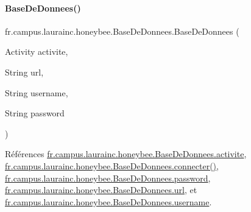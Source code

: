 \paragraph{\texorpdfstring{Base\+De\+Donnees()}{BaseDeDonnees()}\hspace{0.1cm}{\footnotesize\ttfamily [4/4]}}
{\footnotesize\ttfamily fr.\+campus.\+laurainc.\+honeybee.\+Base\+De\+Donnees.\+Base\+De\+Donnees (\begin{DoxyParamCaption}\item[{Activity}]{activite,  }\item[{String}]{url,  }\item[{String}]{username,  }\item[{String}]{password }\end{DoxyParamCaption})\hspace{0.3cm}{\ttfamily [private]}}



Références \hyperlink{classfr_1_1campus_1_1laurainc_1_1honeybee_1_1_base_de_donnees_aad4fd29f29916bc4277fa16262d19431}{fr.\+campus.\+laurainc.\+honeybee.\+Base\+De\+Donnees.\+activite}, \hyperlink{classfr_1_1campus_1_1laurainc_1_1honeybee_1_1_base_de_donnees_a08564ea7dccde161d6eac4b8879401bb}{fr.\+campus.\+laurainc.\+honeybee.\+Base\+De\+Donnees.\+connecter()}, \hyperlink{classfr_1_1campus_1_1laurainc_1_1honeybee_1_1_base_de_donnees_af1bb604a666a7eee9edd93b6cafaf064}{fr.\+campus.\+laurainc.\+honeybee.\+Base\+De\+Donnees.\+password}, \hyperlink{classfr_1_1campus_1_1laurainc_1_1honeybee_1_1_base_de_donnees_ad1d04b4da375002e91d8370b9d19918e}{fr.\+campus.\+laurainc.\+honeybee.\+Base\+De\+Donnees.\+url}, et \hyperlink{classfr_1_1campus_1_1laurainc_1_1honeybee_1_1_base_de_donnees_a7d1662e10f11f740155774b625ed1a87}{fr.\+campus.\+laurainc.\+honeybee.\+Base\+De\+Donnees.\+username}.


